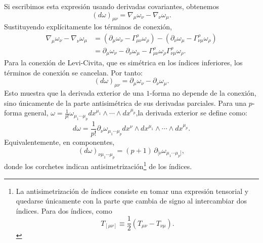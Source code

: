 \documentclass[a4paper,11pt]{book} %
\begin{document}
Si escribimos esta expresión usando derivadas covariantes, obtenemos
\begin{equation}
    (d\omega)_{\mu\nu}
    =
    \nabla_\mu \omega_\nu
    -
    \nabla_\nu \omega_\mu.
\end{equation}
Sustituyendo explícitamente los términos de conexión,
\begin{equation}
\begin{aligned}
    \nabla_\mu \omega_\nu
    -
    \nabla_\nu \omega_\mu
    &=
    \left(
        \partial_\mu \omega_\nu
        -
        \Gamma^\rho_{\mu\nu}\omega_\rho
    \right)
    -
    \left(
        \partial_\nu \omega_\mu
        -
        \Gamma^\rho_{\nu\mu}\omega_\rho
    \right)
    \\
    &=
    \partial_\mu \omega_\nu
    -
    \partial_\nu \omega_\mu
    -
    \Gamma^\rho_{\mu\nu}\omega_\rho
    \Gamma^\rho_{\nu\mu}\omega_\rho.
\end{aligned}
\end{equation}
\noindent
Para la conexión de Levi-Civita, que es simétrica en los índices inferiores, los términos de conexión se cancelan. Por tanto:
\begin{equation}
    (d\omega)_{\mu\nu}
    =
    \partial_\mu \omega_\nu
    -
    \partial_\nu \omega_\mu.
\end{equation}
Esto muestra que la derivada exterior de una \(1\)-forma no depende de la
conexión, sino únicamente de la parte antisimétrica de sus derivadas parciales.
\medskip\newline
Para una \(p\)-forma general, $ \omega
    =
    \frac{1}{p!}
    \omega_{\mu_1\cdots\mu_p}
    dx^{\mu_1}\wedge\cdots\wedge dx^{\mu_p}$,la derivada exterior se define como:
\begin{equation}
    d\omega
    =
    \frac{1}{p!}
    \partial_\nu \omega_{\mu_1\cdots\mu_p}
    dx^\nu \wedge dx^{\mu_1}\wedge\cdots\wedge dx^{\mu_p}.
\end{equation}
Equivalentemente, en componentes,
\begin{equation}
    (d\omega)_{\nu\mu_1\cdots\mu_p}
    =
    (p+1)\,
    \partial_{[\nu}
    \omega_{\mu_1\cdots\mu_p]},
\end{equation}
donde los corchetes indican antisimetrización\footnote{La antisimetrización de índices consiste en tomar una expresión tensorial y quedarse únicamente con la parte que cambia de signo al intercambiar dos índices. Para dos índices, como
\begin{equation}
    T_{[\mu\nu]}
    \equiv
    \frac{1}{2}
    \left(
  T_{\mu\nu}
   -
T_{\nu\mu}
    \right).
\end{equation}} de los índices.
\end{document}
